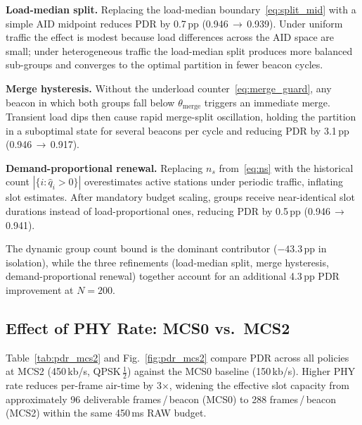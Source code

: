 \documentclass[conference]{IEEEtran}
\begin{document}
\textbf{Load-median split.}
Replacing the load-median boundary~\eqref{eq:split_mid} with a simple
AID midpoint reduces PDR by 0.7\,pp (0.946\,$\to$\,0.939).
Under uniform traffic the effect is modest because load differences
across the AID space are small; under heterogeneous traffic the load-median
split produces more balanced sub-groups and converges to the optimal
partition in fewer beacon cycles.

\textbf{Merge hysteresis.}
Without the underload counter~\eqref{eq:merge_guard}, any beacon in which
both groups fall below $\theta_\mathrm{merge}$ triggers an immediate merge.
Transient load dips then cause rapid merge-split oscillation, holding the
partition in a suboptimal state for several beacons per cycle and reducing
PDR by 3.1\,pp (0.946\,$\to$\,0.917).

\textbf{Demand-proportional renewal.}
Replacing $n_s$ from~\eqref{eq:ns} with the historical count
$|\{i:\hat{q}_i>0\}|$ overestimates active stations under periodic
traffic, inflating slot estimates.
After mandatory budget scaling, groups receive near-identical slot
durations instead of load-proportional ones, reducing PDR by 0.5\,pp
(0.946\,$\to$\,0.941).

The dynamic group count bound is the dominant contributor
($-43.3$\,pp in isolation), while the three refinements (load-median
split, merge hysteresis, demand-proportional renewal) together account
for an additional 4.3\,pp PDR improvement at $N\!=\!200$.

\subsection{Effect of PHY Rate: MCS0 vs.\ MCS2}
\label{sec:mcs2}

Table~\ref{tab:pdr_mcs2} and Fig.~\ref{fig:pdr_mcs2} compare PDR across
all policies at MCS2 (450\,kb/s, QPSK\,$\frac{1}{2}$) against the
MCS0 baseline (150\,kb/s).
Higher PHY rate reduces per-frame air-time by 3$\times$, widening the
effective slot capacity from approximately 96 deliverable
frames\,/\,beacon (MCS0) to 288 frames\,/\,beacon (MCS2) within the
same 450\,ms RAW budget.
\end{document}
